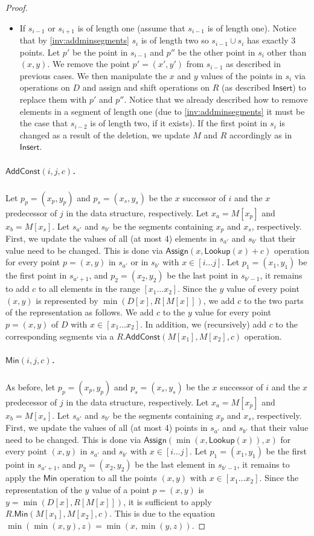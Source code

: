 \documentclass[10pt,a4paper]{article}
\newcommand{\AssignOp}{\mathsf{Assign}}
\newcommand{\Insert}{\mathsf{Insert}}
\newcommand{\Lookup}{\mathsf{Lookup}}
\newcommand{\Add}{\mathsf{AddConst}}
\newcommand{\Min}{\mathsf{Min}}
\newcommand{\para}[1]{\vspace{-0.1in} \subparagraph*{#1}}
\begin{document}
\begin{proof}
\begin{itemize}
    \item If $s_{i-1}$ or $s_{i+1}$ is of length one (assume that $s_{i-1}$ is of length one).
        Notice that by \cref{inv:addminsegments} $s_{i}$ is of length two so $s_{i-1}\cup s_{i}$ has exactly $3$ points.
        Let $p'$ be the point in $s_{i-1}$ and $p''$ be the other point in $s_{i}$ other than $(x,y)$.
        We remove the point $p'=(x',y')$ from $s_{i-1}$ as described in previous cases.
        We then manipulate the $x$ and $y$ values of the points in $s_i$ via operations on $D$ and assign and shift operations on $R$ (as described  $\Insert$) to replace them with $p'$ and $p''$.
        Notice that we already described how to remove elements in a segment of length one (due to \cref{inv:addminsegments} it must be the case that $s_{i-2}$ is of length two, if it exists).
        If the first point in $s_{i}$ is changed as a result of the deletion, we update $M$ and $R$ accordingly as in $\Insert$.
\end{itemize}

\para{$\Add(i,j,c)$.}
Let $p_p = (x_p,y_p)$ and $p_s = (x_s,y_s)$ be the $x$ successor of $i$ and the $x$ predecessor of $j$ in the data structure, respectively.
Let $x_a= M[x_p]$ and $x_b=M[x_s]$. Let $s_{a'}$ and $s_{b'}$ be the segments containing $x_p$ and $x_s$, respectively.
First, we update the values of all (at most 4) elements in $s_{a'}$ and $s_{b'}$ that their value need to be changed. 
This is done via $\AssignOp(x, \Lookup(x)+c)$ operation for every point $p=(x,y)$ in $s_{a'}$ or in $s_{b'}$ with $x\in [i\ldots j]$.
Let $p_1 = (x_1,y_1)$ be the first point in $s_{a'+1}$, and $p_2= (x_2,y_2)$ be the last point in $s_{b'-1}$, it remains to add $c$ to all elements in the range $[x_1\ldots x_2]$.
Since the $y$ value of every point $(x,y)$ is represented by $\min(D[x],R[M[x]])$, we add $c$ to the two parts of the representation as follows.
We add $c$ to the $y$ value for every point $p=(x,y)$ of $D$ with $x \in [x_1 \ldots x_2]$.
In addition, we (recursively) add $c$ to the corresponding segments via a $R.\Add(M[x_1],M[x_2],c)$ operation.

\para{$\Min(i,j,c)$.}
As before, let $p_p = (x_p,y_p)$ and $p_s = (x_s,y_s)$ be the $x$ successor of $i$ and the $x$ predecessor of $j$ in the data structure, respectively.
Let $x_a= M[x_p]$ and $x_b=M[x_s]$. Let $s_{a'}$ and $s_{b'}$ be the segments containing $x_p$ and $x_s$, respectively.
First, we update the values of all (at most 4) points in $s_{a'}$ and $s_{b'}$ that their value need to be changed. 
This is done via $\AssignOp(\min(x,\Lookup(x)),x)$ for every point $(x,y)$ in $s_{a'}$ and $s_{b'}$ with $x\in[i\ldots j]$.
Let $p_1=(x_1,y_1)$ be the first point in $s_{a'+1}$, and $p_2 = (x_2,y_2)$ be the last element in $s_{b'-1}$, it remains to apply the $\Min$ operation to all the points $(x,y)$ with $x \in [x_1\ldots x_2]$.
Since the representation of the $y$ value of a point $p=(x,y)$ is $y = \min(D[x],R[M[x]])$, it is sufficient to apply $R.\Min(M[x_1],M[x_2],c)$.
This is due to the equation $\min(\min(x,y),z)=\min(x,\min(y,z))$.


\end{proof}
\end{document}
